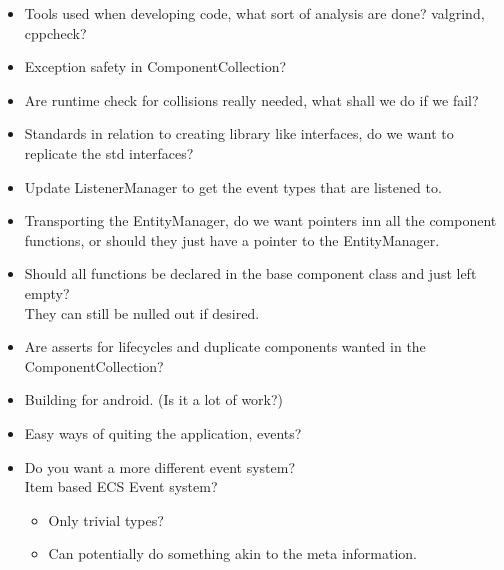\documentclass{article}
\begin{document}
\begin{itemize}
    \item 
    Tools used when developing code, what sort of analysis are done? valgrind, cppcheck?

    \item
    Exception safety in ComponentCollection?

    \item
    Are runtime check for collisions really needed, what shall we do if we fail?
    
    \item 
    Standards in relation to creating library like interfaces, do we want to replicate the std interfaces?
    
    \item 
    Update ListenerManager to get the event types that are listened to.
    
    \item 
    Transporting the EntityManager, do we want pointers inn all the component functions, 
    or should they just have a pointer to the EntityManager.

    \item
    Should all functions be declared in the base component class and just left empty?\\
    They can still be nulled out if desired.

    \item
    Are asserts for lifecycles and duplicate components wanted in the ComponentCollection?

    \item
    Building for android. (Is it a lot of work?)

    \item
    Easy ways of quiting the application, events?
    
    \item
    Do you want a more different event system?\\
    Item based ECS Event system?
    \begin{itemize}
        \item
        Only trivial types?

        \item
        Can potentially do something akin to the meta information.
    \end{itemize}

\end{itemize}
\end{document}
